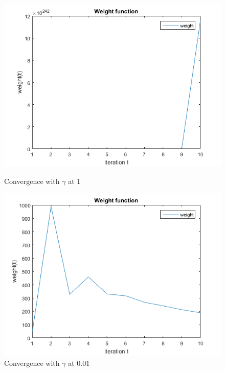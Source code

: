 \begin{figure}[!ht]
	\begin{minipage}{0.5 \textwidth}
		\centering
		\includegraphics[width=1\textwidth]{img/WeightFunction1}
		\caption{Convergence with $\gamma$ at 1}
		\label{fig:weight1}
	\end{minipage}
	\begin{minipage}{0.5 \textwidth}
		\centering
		\includegraphics[width=1\textwidth]{img/WeightFunction01}
		\caption{Convergence with $\gamma$ at 0.01}
		\label{fig:weight01}
	\end{minipage}
\end{figure}


